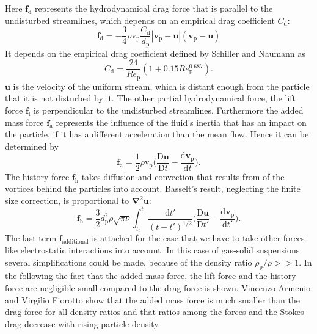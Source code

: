 \documentclass[11pt,a4paper,openany,oneside,parskip=half*]{article}
\renewcommand*\vec[1]{\boldsymbol{#1}}
\begin{document}
Here $\vec{f}_\mathrm{d}$ represents the hydrodynamical drag force that is parallel to the undisturbed streamlines, which depends on an empirical drag coefficient $C_{\mathrm{d}} $:
\begin{equation}
\vec{f}_\mathrm{d}=-\frac{3}{4}\rho \mathrm{v}_\mathrm{p} \frac{C_\mathrm{d}}{d_\mathrm{p}}|\vec{v}_\mathrm{p}-\vec{u}|(\vec{v}_\mathrm{p}-\vec{u})
\end{equation}
It depends on the empirical drag coefficient defined by Schiller and Naumann as
\begin{equation} \label{C_d}
C_\mathrm{d} = \frac{24}{Re_\mathrm{p}}(1+0.15Re_\mathrm{p}^\mathrm{0.687}).
\end{equation}
$\vec{u}$ is the velocity of the uniform stream, which is distant enough from the particle that it is not disturbed by it.
The other partial hydrodynamical force, the lift force $\vec{f}_\mathrm{l}$ is perpendicular to the undisturbed streamlines.
Furthermore the added mass force $\vec{f}_\mathrm{a}$ represents the influence of the fluid's inertia that has an impact on the particle, if it has a different acceleration than the mean flow.
Hence it can be determined by
\begin{equation}
\vec{f}_\mathrm{a} =  \frac{1}{2}\rho \mathrm{v}_\mathrm{p} \biggl(\frac{\mathrm{D}\vec{u}}{\mathrm{D}t}-\frac{\mathrm{d}\vec{v}_\mathrm{p}}{\mathrm{d}t}\biggl).
\end{equation}
The history force $\vec{f}_\mathrm{h}$ takes diffusion and convection that results from of the vortices behind the particles into account. Basselt's result, neglecting the finite size correction, is proportional to $\vec\nabla^\mathrm{2}\vec{u}$:
\begin{equation}
\vec{f}_\mathrm{h} = \frac{3}{2}d_\mathrm{p}^\mathrm{2}\rho\sqrt{\pi\nu}\int_{t_\mathrm{0}}^{t} \frac{\mathrm{d}t'}{(t-t')^\mathrm{1/2}} \biggl(\frac{\mathrm{D}\vec{u}}{\mathrm{D}t'}- \frac{\mathrm{d}\vec{v}_\mathrm{p}}{\mathrm{d}t'}\biggl).  
\end{equation}
The last term $\vec{f}_\mathrm{additional}$ is attached for the case that we have to take other forces like electrostatic interactions into account.
In this case of gas-solid suspensions several simplifications could be made, because of the density ratio $\rho_\mathrm{p}/\rho >> 1$.
\newline
In the following the fact that the added mass force, the lift force and the history force are negligible small compared to the drag force is shown.
Vincenzo Armenio and Virgilio Fiorotto \cite{TheImportanceOfTheFocusActingOnParticlesInTurbulentFlows} show that the added mass force is much smaller than the drag force for all density ratios and that ratios among the forces and the Stokes drag decrease with rising particle density.
\end{document}
